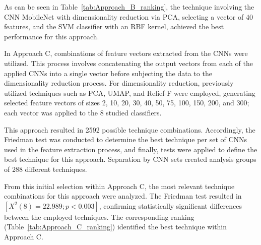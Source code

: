 \documentclass[preprint,12pt]{elsarticle}
\begin{document}
As can be seen in Table~\ref{tab:Approach_B_ranking}, the technique involving the CNN MobileNet with dimensionality reduction via PCA, selecting a vector of 40 features, and the SVM classifier with an RBF kernel, achieved the best performance for this approach.

In Approach C, combinations of feature vectors extracted from the CNNs were utilized. This process involves concatenating the output vectors from each of the applied CNNs into a single vector before subjecting the data to the dimensionality reduction process. For dimensionality reduction, previously utilized techniques such as PCA, UMAP, and Relief-F were employed, generating selected feature vectors of sizes 2, 10, 20, 30, 40, 50, 75, 100, 150, 200, and 300; each vector was applied to the 8 studied classifiers.

This approach resulted in 2592 possible technique combinations. Accordingly, the Friedman test was conducted to determine the best technique per set of CNNs used in the feature extraction process, and finally, tests were applied to define the best technique for this approach. Separation by CNN sets created analysis groups of 288 different techniques.

From this initial selection within Approach C, the most relevant technique combinations for this approach were analyzed. The Friedman test resulted in $[X^2(8)=22.989; p<0.003]$, confirming statistically significant differences between the employed techniques. The corresponding ranking (Table~\ref{tab:Approach_C_ranking}) identified the best technique within Approach C.
\end{document}
